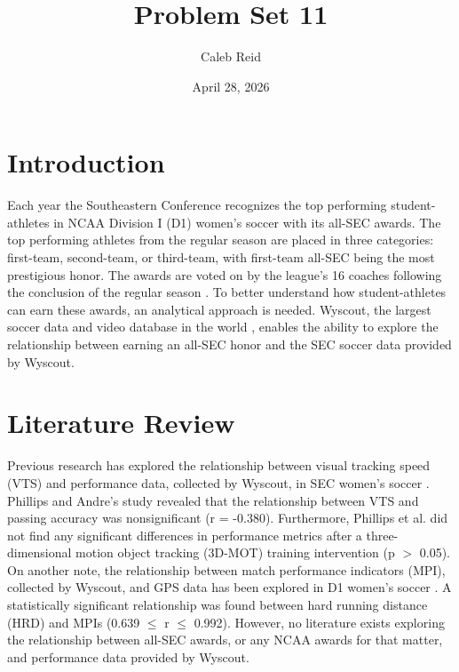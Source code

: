 \documentclass{article}
\title{Problem Set 11}
\date{April 28, 2026}
\author{Caleb Reid}
\begin{document}
\maketitle

\section{Introduction}
Each year the Southeastern Conference recognizes the top performing student-athletes in NCAA Division I (D1) women’s soccer with its all-SEC awards. The top performing athletes from the regular season are placed in three categories: first-team, second-team, or third-team, with first-team all-SEC being the most prestigious honor. The awards are voted on by the league’s 16 coaches following the conclusion of the regular season \cite{sec2025}.
To better understand how student-athletes can earn these awards, an analytical approach is needed. Wyscout, the largest soccer data and video database in the world \cite{wyscout}, enables the ability to explore the relationship between earning an all-SEC honor and the SEC soccer data provided by Wyscout.

\section{Literature Review}
Previous research has explored the relationship between visual tracking speed (VTS) and performance data, collected by Wyscout, in SEC women’s soccer \cite{phillips2022,phillips2023}. Phillips and Andre’s study revealed that the relationship between VTS and passing accuracy was nonsignificant (r  = -0.380). Furthermore, Phillips et al. did not find any significant differences in performance metrics after a three-dimensional motion object tracking (3D-MOT) training intervention (p $>$ 0.05). On another note, the relationship between match performance indicators (MPI), collected by Wyscout, and GPS data has been explored in D1 women’s soccer \cite{sam2023}. A statistically significant relationship was found between hard running distance (HRD) and MPIs (0.639 $\leq$ r $\leq$ 0.992). However, no literature exists exploring the relationship between all-SEC awards, or any NCAA awards for that matter, and performance data provided by Wyscout.
\end{document}
